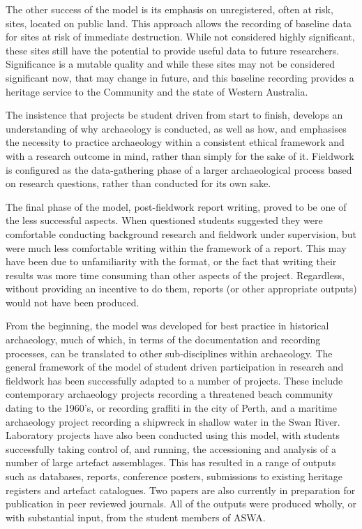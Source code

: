\documentclass[%
]{ijsra}
\begin{document}
	The other success of the model is its emphasis on unregistered, often at risk, sites, located on public land. This approach allows the recording of baseline data for sites at risk of immediate destruction. While not considered highly significant, these sites still have the potential to provide useful data to future researchers. 
	Significance is a mutable quality \parencites{bowdler1984}{brown2008} and while these sites may not be considered significant now, that may change in future, and this baseline recording provides a heritage service to the Community and the state of Western Australia. 
	
	The insistence that projects be student driven from start to finish, develops an understanding of why archaeology is conducted, as well as how, and emphasises the necessity to practice archaeology within a consistent ethical framework and with a research outcome in mind, rather than simply for the sake of it. 
	Fieldwork is configured as the data-gathering phase of a larger archaeological process based on research questions, rather than conducted for its own sake. 
	
	The final phase of the model, post-fieldwork report writing, proved to be one of the less successful aspects. When questioned students suggested they were comfortable conducting background research and fieldwork under supervision, but were much less comfortable writing within the framework of a report. 
	This may have been due to unfamiliarity with the format, or the fact that writing their results was more time consuming than other aspects of the project. Regardless, without providing an incentive to do them, reports (or other appropriate outputs) would not have been produced.
	
	From the beginning, the model was developed for best practice in historical archaeology, much of which, in terms of the documentation and recording processes, can be translated to other sub-disciplines within archaeology. 
	The general framework of the model of student driven participation in research and fieldwork has been successfully adapted to a number of projects. These include contemporary archaeology projects recording a threatened beach community dating to the 1960's, or recording graffiti in the city of Perth, and a maritime archaeology project recording a shipwreck in shallow water in the Swan River. 
	Laboratory projects have also been conducted using this model, with students successfully taking control of, and running, the accessioning and analysis of a number of large artefact assemblages. This has resulted in a range of outputs such as databases, reports, conference posters, submissions to existing heritage registers and artefact catalogues. 
	Two papers are also currently in preparation for publication in peer reviewed journals. All of the outputs were produced wholly, or with substantial input, from the student members of ASWA.
	
\end{document}
